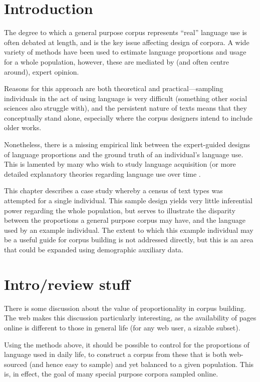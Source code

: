\section{Introduction}
The degree to which a general purpose corpus represents ``real'' language use is often debated at length, and is the key issue affecting design of corpora.  A wide variety of methods have been used to estimate language proportions and usage for a whole population, however, these are mediated by (and often centre around), expert opinion.

Reasons for this approach are both theoretical and practical---sampling individuals in the act of using language is very difficult (something other social sciences also struggle with), and the persistent nature of texts means that they conceptually stand alone, especially where the corpus designers intend to include older works.

Nonetheless, there is a missing empirical link between the expert-guided designs of language proportions and the ground truth of an individual's language use.  This is lamented by many who wish to study language acquisition (or more detailed explanatory theories regarding language use over time .

This chapter describes a case study whereby a census of text types was attempted for a single individual.  This sample design yields very little inferential power regarding the whole population, but serves to illustrate the disparity between the proportions a general purpose corpus may have, and the language used by an example individual.  The extent to which this example individual may be a useful guide for corpus building is not addressed directly, but this is an area that could be expanded using demographic auxiliary data.





\section{Intro/review stuff}

There is some discussion about the value of proportionality in corpus building.  The web makes this discussion particularly interesting, as the availability of pages online is different to those in general life (for any web user, a sizable subset).

Using the methods above, it should be possible to control for the proportions of language used in daily life, to construct a corpus from these that is both web-sourced (and hence easy to sample) and yet balanced to a given population.  This is, in effect, the goal of many special purpose corpora sampled online.


